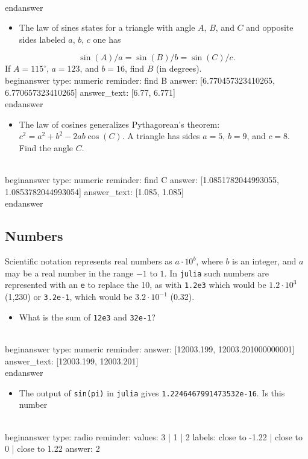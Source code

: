 \documentclass[12pt]{article}
\begin{document}
\\end{answer}
\begin{itemize}\item The law of sines states for a triangle with angle $A$, $B$, and $C$ and opposite sides labeled $a$, $b$, $c$ one has \end{itemize}
$$ 
\sin(A)/a = \sin(B)/b = \sin(C)/c.
$$
\newline
If $A=115^\circ$, $a=123$, and $b=16$, find $B$ (in degrees).
\\begin{answer}
    type: numeric
    reminder: find B
    answer: [6.770457323410265, 6.770657323410265]
    answer_text: [6.77, 6.771] 
\\end{answer}
\begin{itemize}\item The law of cosines generalizes Pythagorean's theorem: $c^2 = a^2 +   b^2 - 2ab \cos(C)$. A triangle has sides $a=5$, $b=9$, and   $c=8$. Find the angle $C$.\end{itemize}
\\begin{answer}
    type: numeric
    reminder: find C
    answer: [1.0851782044993055, 1.0853782044993054]
    answer_text: [1.085, 1.085] 
\\end{answer}
\subsection{Numbers}\newline
Scientific notation represents real numbers as $a \cdot 10^b$, where $b$ is an integer, and $a$ may be a real number in the range $-1$ to $1$. In \texttt{julia} such numbers are represented with an \texttt{e} to replace the 10, as with \texttt{1.2e3} which would be $1.2 \cdot 10^3$ (1,230) or \texttt{3.2e-1}, which would be $3.2 \cdot 10^{-1}$ (0.32).\begin{itemize}\item What is the sum of \texttt{12e3} and \texttt{32e-1}?\end{itemize}
\\begin{answer}
    type: numeric
    reminder: 
    answer: [12003.199, 12003.201000000001]
    answer_text: [12003.199, 12003.201] 
\\end{answer}
\begin{itemize}\item The output of \texttt{sin(pi)} in \texttt{julia} gives \texttt{1.2246467991473532e-16}. Is this number\end{itemize}
\\begin{answer}
type: radio
reminder: 
values: 3 | 1 | 2
labels: close to -1.22 | close to 0 | close to 1.22
answer: 2
\end{document}
